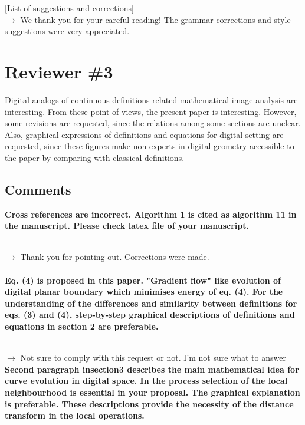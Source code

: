 \documentclass[12pt]{article}
\begin{document}
[List of suggestions and corrections]
~\\

$\rightarrow$ We thank you for your careful reading! The grammar corrections and style suggestions were very appreciated.
~\\



\section{Reviewer \#3}

Digital analogs of continuous definitions related mathematical image analysis are interesting. From these point of views, the present paper is interesting. However, some revisions are requested, since the relations among some sections are unclear. Also, graphical expressions of definitions and equations for digital setting are requested, since these figures make non-experts in digital geometry accessible to the paper by comparing with classical definitions.

\subsection{Comments}

\textbf{Cross references are incorrect. Algorithm 1 is cited as algorithm 11 in the manuscript.
Please check latex file of your manuscript.}

~\\
$\rightarrow$ Thank you for pointing out. Corrections were made.
~\\


~\\
\textbf{Eq. (4) is proposed in this paper.
"Gradient flow" like evolution of digital planar boundary which minimises energy of eq. (4).
For the understanding of the differences and similarity between definitions for eqs. (3) and (4),
step-by-step graphical descriptions of definitions and equations in section 2 are preferable.}

~\\
$\rightarrow$ Not sure to comply with this request or not. I’m not sure what to answer
~\\


\textbf{Second paragraph insection3 describes the main mathematical idea for curve evolution in digital space. In the process selection of the local neighbourhood is essential in your proposal. The graphical explanation is preferable. These descriptions provide the necessity of the distance transform in the local operations.}
\end{document}
